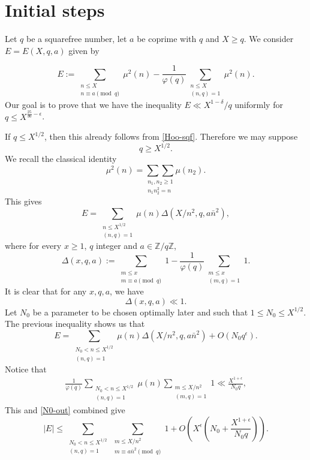\documentclass[a4paper, 11pt]{amsart}
\theoremstyle{plain}
\theoremstyle{definition}
\newcommand{\Z}{\mathbb{Z}}
\newcommand{\rmod}{\!\!\!\!\pmod}
\begin{document}
\section{Initial steps}

Let $q$ be a squarefree number, let $a$ be coprime with $q$ and $X\geq q$. We consider $E=E(X,q,a)$ given by

$$
E:=\sum_{\substack{n\leq X\\n\equiv a \rmod q}}\mu^2(n) - \frac{1}{\varphi(q)}\sum_{\substack{n\leq X\\(n,q)=1}}\mu^2(n).
$$
Our goal is to prove that we have the inequality $E\ll X^{1-\delta}/q$ uniformly for $q\leq X^{\frac{25}{36}-\epsilon}$.

If $q\leq X^{1/2}$, then this already follows from \eqref{Hoo-sqf}. Therefore we may suppose
%
$$
q\geq X^{1/2}.
$$
%
We recall the classical identity
%
\begin{equation}\label{mu-decomp}
\mu^2(n)=\underset{\substack{n_1,n_2\geq 1\\n_1n_2^2=n}}{\sum\sum}\mu(n_2).
\end{equation}
This gives
%
$$
E=\sum_{\substack{n\leq X^{1/2}\\(n,q)=1}}\mu(n)\Delta(X/n^2,q,a{\bar n}^2),
$$
where for every $x\geq 1$, $q$ integer and $a\in \Z/q\Z$,
$$
\Delta(x,q,a):=\sum_{\substack{m\leq x\\m\equiv a \rmod q}}1 - \frac{1}{\varphi(q)}\sum_{\substack{m\leq x\\(m,q)=1}}1.
$$
%
It is clear that for any $x,q,a$, we have
$$
\Delta(x,q,a) \ll 1.
$$
Let $N_0$ be a parameter to be chosen optimally later and such that $1\leq N_0\leq X^{1/2}$. The previous inequality shows us that
%
\begin{equation}\label{N0-out}
E=\sum_{\substack{N_0<n\leq X^{1/2}\\(n,q)=1}}\mu(n)\Delta(X/n^2,q,a{\bar n}^2) + O(N_0q^{\epsilon}).
\end{equation}
%
Notice that
%
\begin{align*}
\frac{1}{\varphi(q)}\sum_{\substack{N_0<n\leq X^{1/2}\\(n,q)=1}}\mu(n)
\sum_{\substack{m\leq X/n^2\\(m,q)=1}}1\ll \frac{X^{1+\epsilon}}{N_0q},
\end{align*}
This and \eqref{N0-out} combined give
%
\begin{equation}\label{beforedyadic}
|E|\leq \sum_{\substack{N_0<n\leq X^{1/2}\\(n,q)=1}}\sum_{\substack{m\leq X/n^2\\m\equiv a{\bar n}^2\rmod q}}1 + O\left(X^{\epsilon}\left(N_0+\frac{X^{1+\epsilon}}{N_0q}\right)\right).
\end{equation}
%
\end{document}
